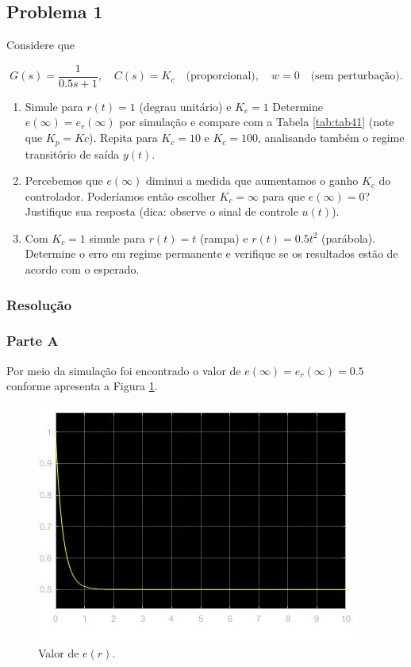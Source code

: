 \documentclass[
]{book}
\providecommand{\tightlist}{%
  \setlength{\itemsep}{0pt}\setlength{\parskip}{0pt}}
\begin{document}
\hypertarget{problema-1}{%
\subsection*{Problema 1}\label{problema-1}}

Considere que

\[
G(s) = \frac {1}{0.5s+1}, \quad C(s) = K_c \quad \text{(proporcional)}, \quad w=0 \quad \text{(sem perturbação)}.
\]

\begin{enumerate}
\def\labelenumi{\alph{enumi}.}
\tightlist
\item
  Simule para \(r(t) = 1\) (degrau unitário) e \(K_c = 1\) Determine \(e(\infty) = e_r(\infty)\) por simulação e compare com a Tabela \ref{tab:tab41} (note que \(K_p = Kc\)). Repita para \(K_c = 10\) e \(K_c = 100\), analisando também o regime transitório de saída \(y(t)\).
\item
  Percebemos que \(e(\infty)\) diminui a medida que aumentamos o ganho \(K_c\) do controlador. Poderíamos então escolher \(K_c = \infty\) para que \(e(\infty) = 0\)? Justifique sua resposta (dica: observe o sinal de controle \(u(t)\)).
\item
  Com \(K_c = 1\) simule para \(r(t) = t\) (rampa) e \(r(t) = 0.5t^2\) (parábola). Determine o erro em regime permanente e verifique se os resultados estão de acordo com o esperado.
\end{enumerate}

\hypertarget{resoluuxe7uxe3o}{%
\subsubsection*{Resolução}\label{resoluuxe7uxe3o}}

\hypertarget{parte-a}{%
\subsubsection*{Parte A}\label{parte-a}}

Por meio da simulação foi encontrado o valor de \(e(\infty) = e_r(\infty) = 0.5\) conforme apresenta a Figura \ref{fig:fig41A1}.

\begin{figure}
\includegraphics[width=0.8\linewidth]{Imagens/Lab4/Resolução/prob1A1} \caption{Valor de $e(r)$.}\label{fig:fig41A1}
\end{figure}
\end{document}
